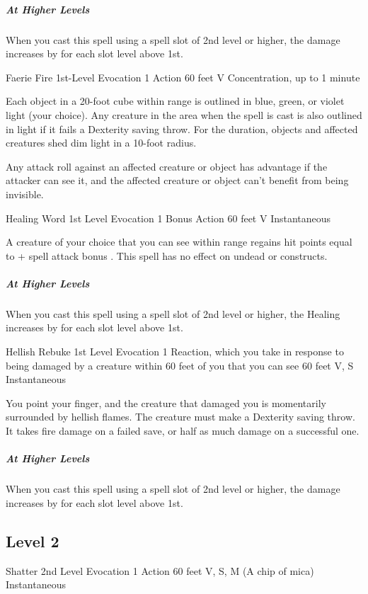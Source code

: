 \documentclass[letterpaper,openany,oneside,twocolumn]{book}
\begin{document}
\subparagraph*{At Higher Levels} When you cast this spell using a spell slot of 2nd level or higher, the damage increases by  for each slot level above 1st.

\DndSpellHeader
  {Faerie Fire}
  {1st-Level Evocation}
  {1 Action}
  {60 feet}
  {V}
  {Concentration, up to 1 minute}

Each object in a 20-foot cube within range is outlined in blue, green, or violet light (your choice). Any creature in the area when the spell is cast is also outlined in light if it fails a Dexterity saving throw. For the duration, objects and affected creatures shed dim light in a 10-foot radius.

Any attack roll against an affected creature or object has advantage if the attacker can see it, and the affected creature or object can't benefit from being invisible.

\DndSpellHeader
  {Healing Word}
  {1st Level Evocation}
  {1 Bonus Action}
  {60 feet}
  {V}
  {Instantaneous}

A creature of your choice that you can see within range regains hit points equal to  + spell attack bonus {\intcalcAdd{\ProficiencyValue}{\calculateModifier{\CharismaScoreValue}}}. This spell has no effect on undead or constructs.

\subparagraph*{At Higher Levels} When you cast this spell using a spell slot of 2nd level or higher, the Healing increases by  for each slot level above 1st.

\DndSpellHeader
  {Hellish Rebuke}
  {1st Level Evocation}
  {1 Reaction, which you take in response to being damaged by a creature within 60 feet of you that you can see}
  {60 feet}
  {V, S}
  {Instantaneous}

You point your finger, and the creature that damaged you is momentarily surrounded by hellish flames. The creature must make a Dexterity saving throw. It takes  fire damage on a failed save, or half as much damage on a successful one.

\subparagraph*{At Higher Levels} When you cast this spell using a spell slot of 2nd level or higher, the damage increases by  for each slot level above 1st.

\subsection*{Level 2}

\DndSpellHeader
  {Shatter}
  {2nd Level Evocation}
  {1 Action}
  {60 feet}
  {V, S, M (A chip of mica)}
  {Instantaneous}
\end{document}
